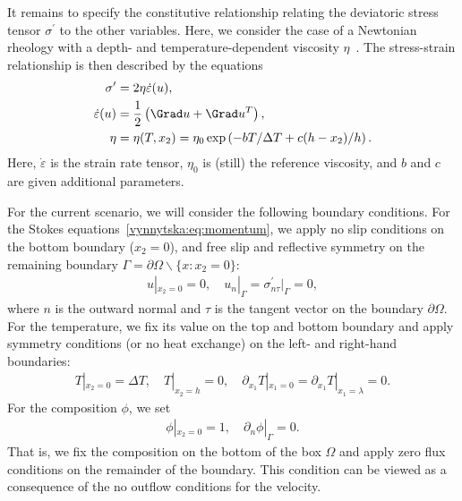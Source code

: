 It remains to specify the constitutive relationship relating the
deviatoric stress tensor $\sigma^{\prime}$ to the other
variables. Here, we consider the case of a Newtonian rheology with a
depth- and temperature-dependent viscosity
$\eta$~\citep{BlankenbachBusse1989}. The stress-strain relationship is
then described by the equations
\begin{align}
  \sigma^{\prime} &= 2 \eta \dot{\varepsilon} (u), \\
  \dot{\varepsilon}(u) &= \frac{1}{2} \left (\Grad u + \Grad u^T \right),  \\
  \eta &= \eta(T, x_2)
  = \eta_0 \exp \left( -b T/\Delta T + c (h - x_2)/ h \right) .
\end{align}
Here, $\dot {\varepsilon}$ is the strain rate tensor, $\eta_0$ is
(still) the reference viscosity, and $b$ and $c$ are given additional
parameters.

For the current scenario, we will consider the following boundary
conditions. For the Stokes equations~\eqref{vynnytska:eq:momentum}, we
apply no slip conditions on the bottom boundary ($x_2 = 0$), and free
slip and reflective symmetry on the remaining boundary $\Gamma
= \partial \Omega \backslash \{x: x_2 = 0 \}$:
\begin{align}
  \label{vynnytska:eq:bcs}
  u |_{x_2 = 0} = 0, \quad
  u_n|_{\Gamma}  =  \sigma^{\prime}_{n \tau} |_{\Gamma} = 0,
\end{align}
where $n$ is the outward normal and $\tau$ is the tangent vector on
the boundary $\partial \Omega$. For the temperature, we fix its value
on the top and bottom boundary and apply symmetry conditions (or no
heat exchange) on the left- and right-hand boundaries:
\begin{align}
  T |_{x_2 = 0} = \Delta T, \quad T |_{x_2 = h}  = 0, \quad
  \partial_{x_1} T |_{x_1 = 0}  = \partial_{x_1} T |_{x_1 = \lambda} = 0.
\end{align}
For the composition $\phi$, we set
\begin{align}
  \phi |_{x_2 = 0} = 1, \quad \partial_{n} \phi|_{\Gamma} = 0.
\end{align}
That is, we fix the composition on the bottom of the box $\Omega$ and
apply zero flux conditions on the remainder of the boundary. This
condition can be viewed as a consequence of the no outflow conditions
for the velocity.

